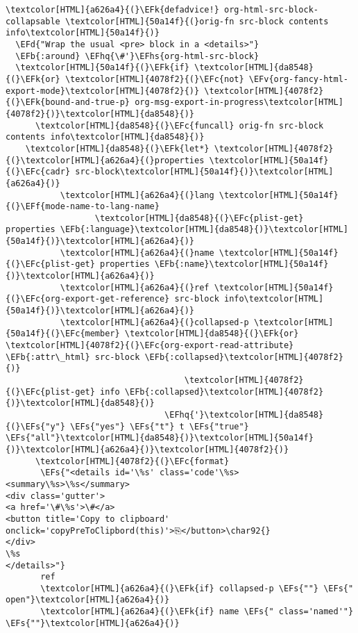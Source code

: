 \documentclass{scrartcl}
\newcommand{\EFk}[1]{\textcolor{EFk}{#1}} %
\newcommand{\EFd}[1]{\textcolor{EFd}{\textit{#1}}} %
\newcommand{\EFs}[1]{\textcolor{EFs}{#1}} %
\newcommand{\EFb}[1]{\textcolor{EFb}{#1}} %
\newcommand{\EFc}[1]{\textcolor{EFc}{#1}} %
\newcommand{\EFv}[1]{\textcolor{EFv}{#1}} %
\newcommand{\EFf}[1]{\textcolor{EFf}{#1}} %
\newcommand{\EFhq}[1]{\textcolor{EFhq}{#1}} %
\newcommand{\EFhs}[1]{\textcolor{EFhs}{#1}} %
\begin{document}
\begin{Code}
\begin{Verbatim}[]
\textcolor[HTML]{a626a4}{(}\EFk{defadvice!} org-html-src-block-collapsable \textcolor[HTML]{50a14f}{(}orig-fn src-block contents info\textcolor[HTML]{50a14f}{)}
  \EFd{"Wrap the usual <pre> block in a <details>"}
  \EFb{:around} \EFhq{\#'}\EFhs{org-html-src-block}
  \textcolor[HTML]{50a14f}{(}\EFk{if} \textcolor[HTML]{da8548}{(}\EFk{or} \textcolor[HTML]{4078f2}{(}\EFc{not} \EFv{org-fancy-html-export-mode}\textcolor[HTML]{4078f2}{)} \textcolor[HTML]{4078f2}{(}\EFk{bound-and-true-p} org-msg-export-in-progress\textcolor[HTML]{4078f2}{)}\textcolor[HTML]{da8548}{)}
      \textcolor[HTML]{da8548}{(}\EFc{funcall} orig-fn src-block contents info\textcolor[HTML]{da8548}{)}
    \textcolor[HTML]{da8548}{(}\EFk{let*} \textcolor[HTML]{4078f2}{(}\textcolor[HTML]{a626a4}{(}properties \textcolor[HTML]{50a14f}{(}\EFc{cadr} src-block\textcolor[HTML]{50a14f}{)}\textcolor[HTML]{a626a4}{)}
           \textcolor[HTML]{a626a4}{(}lang \textcolor[HTML]{50a14f}{(}\EFf{mode-name-to-lang-name}
                  \textcolor[HTML]{da8548}{(}\EFc{plist-get} properties \EFb{:language}\textcolor[HTML]{da8548}{)}\textcolor[HTML]{50a14f}{)}\textcolor[HTML]{a626a4}{)}
           \textcolor[HTML]{a626a4}{(}name \textcolor[HTML]{50a14f}{(}\EFc{plist-get} properties \EFb{:name}\textcolor[HTML]{50a14f}{)}\textcolor[HTML]{a626a4}{)}
           \textcolor[HTML]{a626a4}{(}ref \textcolor[HTML]{50a14f}{(}\EFc{org-export-get-reference} src-block info\textcolor[HTML]{50a14f}{)}\textcolor[HTML]{a626a4}{)}
           \textcolor[HTML]{a626a4}{(}collapsed-p \textcolor[HTML]{50a14f}{(}\EFc{member} \textcolor[HTML]{da8548}{(}\EFk{or} \textcolor[HTML]{4078f2}{(}\EFc{org-export-read-attribute} \EFb{:attr\_html} src-block \EFb{:collapsed}\textcolor[HTML]{4078f2}{)}
                                    \textcolor[HTML]{4078f2}{(}\EFc{plist-get} info \EFb{:collapsed}\textcolor[HTML]{4078f2}{)}\textcolor[HTML]{da8548}{)}
                                \EFhq{'}\textcolor[HTML]{da8548}{(}\EFs{"y"} \EFs{"yes"} \EFs{"t"} t \EFs{"true"} \EFs{"all"}\textcolor[HTML]{da8548}{)}\textcolor[HTML]{50a14f}{)}\textcolor[HTML]{a626a4}{)}\textcolor[HTML]{4078f2}{)}
      \textcolor[HTML]{4078f2}{(}\EFc{format}
       \EFs{"<details id='\%s' class='code'\%s><summary\%s>\%s</summary>
<div class='gutter'>
<a href='\#\%s'>\#</a>
<button title='Copy to clipboard' onclick='copyPreToClipbord(this)'>⎘</button>\char92{}
</div>
\%s
</details>"}
       ref
       \textcolor[HTML]{a626a4}{(}\EFk{if} collapsed-p \EFs{""} \EFs{" open"}\textcolor[HTML]{a626a4}{)}
       \textcolor[HTML]{a626a4}{(}\EFk{if} name \EFs{" class='named'"} \EFs{""}\textcolor[HTML]{a626a4}{)}

\end{Verbatim}
\end{Code}
\end{document}
